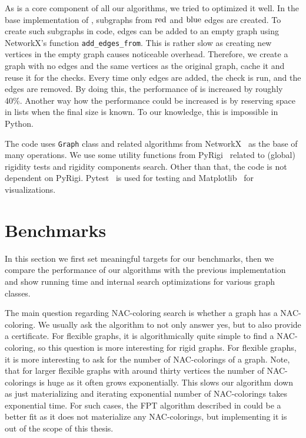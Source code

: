 As \IsNACColoring{} is a core component of all our algorithms,
we tried to optimized it well.
%
In the base implementation of \IsNACColoring{},
subgraphs from \( \text{red} \) and \( \text{blue} \) edges are created.
To create such subgraphs in code, edges can be added to an empty graph
using NetworkX's function \texttt{add\_edges\_from}.
%
This is rather slow as creating new vertices in the empty graph causes noticeable overhead.
Therefore, we create a graph with no edges and the same vertices as the original graph,
cache it and reuse it for the checks.
Every time only edges are added, the check is run, and the edges are removed.
By doing this, the performance of \IsNACColoring{} is increased by roughly 40\%.
%
Another way how the performance could be increased is by reserving space in lists
when the final size is known.
To our knowledge, this is impossible in Python.

The code uses \texttt{Graph} class and related algorithms from NetworkX~\cite{networkx}
as the base of many operations. We use some utility functions from PyRigi~\cite{pyrigi}
related to (global) rigidity tests and rigidity components search.
Other than that, the code is not dependent on PyRigi.
%
Pytest~\cite{pytest} is used for testing and
Matplotlib~\cite{matplotlib} for visualizations.


\section{Benchmarks}

In this section we first set meaningful targets for our benchmarks,
then we compare the performance of our algorithms with the previous implementation
and show running time and internal search optimizations for various graph classes.

The main question regarding NAC-coloring search is whether a graph has a NAC-coloring.
We usually ask the algorithm to not only answer yes, but to also provide a certificate.
%
For flexible graphs, it is algorithmically quite simple to find a NAC-coloring,
so this question is more interesting for rigid graphs.
%
For flexible graphs, it is more interesting to ask for the number of NAC-colorings
of a graph.
Note, that for larger flexible graphs with around thirty vertices
the number of NAC-colorings is huge as it often grows exponentially.
This slows our algorithm down as just materializing and iterating exponential
number of NAC-colorings takes exponential time.
%
For such cases, the FPT algorithm described in 
could be a better fit as it does not materialize any NAC-colorings,
but implementing it is out of the scope of this thesis.

